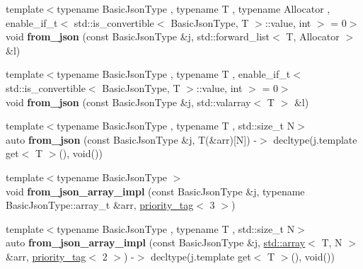 \begin{DoxyCompactItemize}
{\footnotesize template$<$typename Basic\+Json\+Type , typename T , typename Allocator , enable\+\_\+if\+\_\+t$<$ std\+::is\+\_\+convertible$<$ Basic\+Json\+Type, T $>$\+::value, int $>$  = 0$>$ }\\void {\bfseries from\+\_\+json} (const Basic\+Json\+Type \&j, std\+::forward\+\_\+list$<$ T, Allocator $>$ \&l)
\item 
\mbox{\label{namespacenlohmann_1_1detail_a3df497b1d3977f071b488ecac1401517}} 
{\footnotesize template$<$typename Basic\+Json\+Type , typename T , enable\+\_\+if\+\_\+t$<$ std\+::is\+\_\+convertible$<$ Basic\+Json\+Type, T $>$\+::value, int $>$  = 0$>$ }\\void {\bfseries from\+\_\+json} (const Basic\+Json\+Type \&j, std\+::valarray$<$ T $>$ \&l)
\item 
\mbox{\label{namespacenlohmann_1_1detail_a7deb2db8eed6f1762373dde7a6595760}} 
{\footnotesize template$<$typename Basic\+Json\+Type , typename T , std\+::size\+\_\+t N$>$ }\\auto {\bfseries from\+\_\+json} (const Basic\+Json\+Type \&j, T(\&arr)\mbox{[}N\mbox{]}) -\/$>$ decltype(j.\+template get$<$ T $>$(), void())
\item 
\mbox{\label{namespacenlohmann_1_1detail_a40f7bb070a60e8ba14fffb9c117fcbd8}} 
{\footnotesize template$<$typename Basic\+Json\+Type $>$ }\\void {\bfseries from\+\_\+json\+\_\+array\+\_\+impl} (const Basic\+Json\+Type \&j, typename Basic\+Json\+Type\+::array\+\_\+t \&arr, \mbox{\hyperlink{structnlohmann_1_1detail_1_1priority__tag}{priority\+\_\+tag}}$<$ 3 $>$)
\item 
\mbox{\label{namespacenlohmann_1_1detail_aba0ce45ebb69fd2c7132a00f9a56b503}} 
{\footnotesize template$<$typename Basic\+Json\+Type , typename T , std\+::size\+\_\+t N$>$ }\\auto {\bfseries from\+\_\+json\+\_\+array\+\_\+impl} (const Basic\+Json\+Type \&j, \mbox{\hyperlink{namespacenlohmann_1_1detail_a1ed8fc6239da25abcaf681d30ace4985af1f713c9e000f5d3f280adbd124df4f5}{std\+::array}}$<$ T, N $>$ \&arr, \mbox{\hyperlink{structnlohmann_1_1detail_1_1priority__tag}{priority\+\_\+tag}}$<$ 2 $>$) -\/$>$ decltype(j.\+template get$<$ T $>$(), void())
\item 

\end{DoxyCompactItemize}
